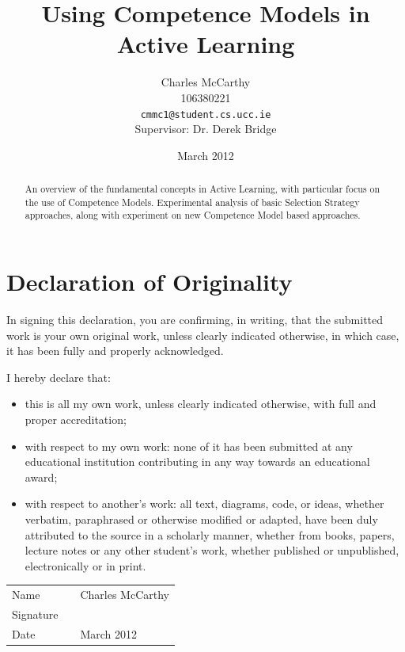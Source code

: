 \documentclass[a4paper,11pt]{report}
\title{Using Competence Models in Active Learning}
\author{Charles McCarthy\\
  106380221\\
  \texttt{cmmc1@student.cs.ucc.ie}
  \\Supervisor: Dr. Derek Bridge}
\date{March 2012}
\begin{document}
\maketitle

\begin{abstract}
An overview of the fundamental concepts in Active Learning, with particular focus on the use of Competence Models. Experimental analysis of basic Selection Strategy approaches, along with experiment on new Competence Model based approaches.
\end{abstract}

\chapter*{Declaration of Originality}
\vspace*{\fill}
In signing this declaration, you are confirming, in writing, that the submitted work is your own original work, unless clearly indicated otherwise, in which case, it has been fully and properly acknowledged.

I hereby declare that:
\begin{itemize}
	\item this is all my own work, unless clearly indicated otherwise, with full and proper accreditation;
	\item with respect to my own work: none of it has been submitted at any educational institution contributing in any way towards an educational award;
	\item with respect to another's work: all text, diagrams, code, or ideas, whether verbatim, paraphrased or otherwise modified or adapted, have been duly attributed to the source in a scholarly manner, whether from books, papers, lecture notes or any other student's work, whether published or unpublished, electronically or in print. 
\end{itemize}

{
\renewcommand{\arraystretch}{4.5}
\begin{center}
 	\begin{tabular}{l @{:} p{0.4in} l}
		Name & & Charles McCarthy \\
		Signature & & \makebox[2.5in]{\hrulefill} \\
		Date & & March 2012 \\
	\end{tabular}
\end{center}
}
\vspace{\fill}
\end{document}
